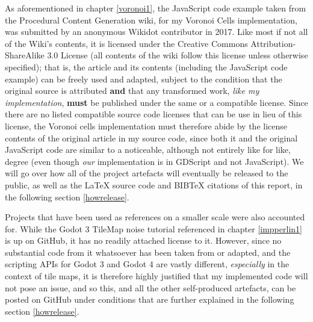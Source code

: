 As aforementioned in chapter \ref{voronoi1}, the JavaScript code example taken from the Procedural Content Generation wiki\cite{pcgwikivoronoi}, for my Voronoi Cells implementation, was submitted by an anonymous Wikidot contributor in 2017. Like most if not all of the Wiki's contents, it is licensed under the Creative Commons Attribution-ShareAlike 3.0 License (all contents of the wiki follow this license unless otherwise specified); that is, the article and its contents (including the JavaScript code example) can be freely used and adapted, subject to the condition that the original source is attributed \textbf{and} that any transformed work, \textit{like my implementation}, \textbf{must} be published under the same or a compatible license.\cite{cc_at_sa_3} Since there are no listed compatible source code licenses that can be use in lieu of this license\cite{cc_compat}, the Voronoi cells implementation must therefore abide by the license contents of the original article in my source code, since both it and the original JavaScript code are similar to a noticeable, although not entirely like for like, degree (even though \textit{our} implementation is in GDScript and not JavaScript). We will go over how all of the project artefacts will eventually be released to the public, as well as the \LaTeX{} source code and BIB\TeX{} citations of this report, in the following section \ref{howrelease}.

Projects that have been used as references on a smaller scale were also accounted for. While the Godot 3 TileMap noise tutorial referenced in chapter \ref{impperlin1} is up on GitHub, it has no readily attached license to it.\cite{gingergd3tutorialGH} However, since no substantial code from it whatsoever has been taken from or adapted, and the scripting APIs for Godot 3 and Godot 4 are vastly different, \textit{especially} in the context of tile maps, it is therefore highly justified that my implemented code will not pose an issue, and so this, and all the other self-produced artefacts, can be posted on GitHub under conditions that are further explained in the following section \ref{howrelease}.

